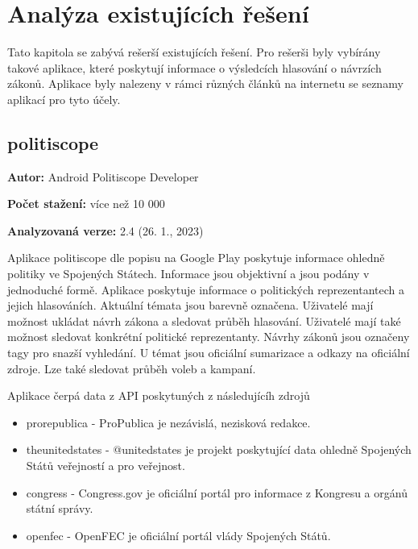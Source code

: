 \chapter{Analýza existujících řešení}

\begin{chapterabstract}
Tato kapitola se zabývá rešerší existujících řešení. Pro rešerši byly vybírány takové \linebreak aplikace, které poskytují informace o výsledcích hlasování o návrzích zákonů. Aplikace byly nalezeny v rámci různých článků na internetu se seznamy aplikací pro tyto účely.
\end{chapterabstract}

\section{politiscope}

\begin{description}
	\item \textbf{Autor:} Android Politiscope Developer
	\item \textbf{Počet stažení:} více než 10 000
	\item \textbf{Analyzovaná verze:} 2.4 (26. 1., 2023)
\end{description}

\noindent Aplikace politiscope \cite{politiscope} dle popisu na Google Play poskytuje informace ohledně politiky ve Spojených Státech. Informace jsou objektivní a jsou podány v jednoduché formě. Aplikace poskytuje informace o politických reprezentantech a jejich hlasováních. Aktuální témata jsou barevně označena. Uživatelé mají možnost ukládat návrh zákona a sledovat průběh hlasování. Uživatelé mají také možnost sledovat konkrétní politické reprezentanty. Návrhy zákonů jsou označeny tagy pro snazší vyhledání. U témat jsou oficiální sumarizace a odkazy na oficiální zdroje. Lze také sledovat průběh voleb a kampaní.

Aplikace čerpá data z API poskytuných z následujícíh zdrojů

\begin{itemize}
	\item prorepublica \cite{propublica} - ProPublica je nezávislá, nezisková redakce.
	\item theunitedstates \cite{unitedstates} - @unitedstates je projekt poskytující data ohledně Spojených Států veřejností a pro veřejnost.
	\item congress \cite{congress} - Congress.gov je oficiální portál pro informace z Kongresu a orgánů státní správy.
	\item openfec \cite{openfec} - OpenFEC je oficiální portál vlády Spojených Států.
\end{itemize}

